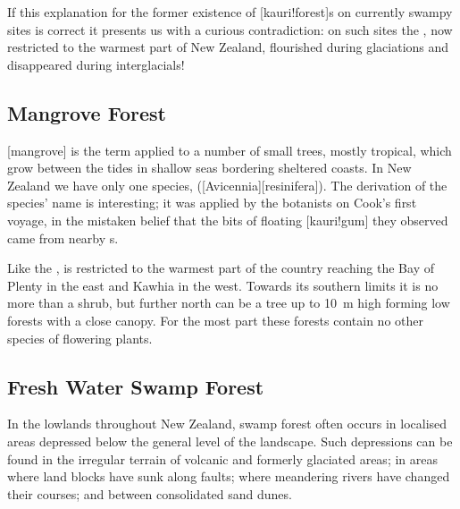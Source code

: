If this explanation for the former existence of [kauri!forest]s on currently swampy sites is correct it presents us with a curious contradiction: on such sites the , now restricted to the warmest part of New Zealand, flourished during glaciations and disappeared during interglacials!

\subsection{Mangrove Forest}

[mangrove] is the term applied to a number of small trees, mostly tropical, which grow between the tides in shallow seas bordering sheltered coasts.
In New Zealand we have only one species,  ([Avicennia][resinifera]).
The derivation of the species' name is interesting; it was applied by the botanists on Cook's first voyage, in the mistaken belief that the bits of floating [kauri!gum] they observed came from nearby s.

Like the ,  is restricted to the warmest part of the country reaching the Bay of Plenty in the east and Kawhia in the west.
Towards its southern limits it is no more than a shrub, but further north  can be a tree up to \SI{10}{\metre} high forming low forests with a close canopy.
For the most part these forests contain no other species of flowering plants.

\subsection{Fresh Water Swamp Forest}

In the lowlands throughout New Zealand, swamp forest often occurs in localised areas depressed below the general level of the landscape.
Such depressions can be found in the irregular terrain of volcanic and formerly glaciated areas; in areas where land blocks have sunk along faults; where meandering rivers have changed their courses; and between consolidated sand dunes.


